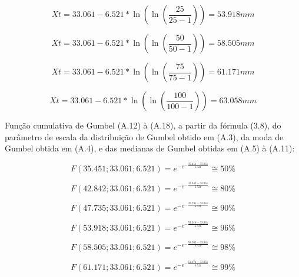 \begin{equation}
Xt = 33.061 - 6.521 * \ln{\left(\ln{\left(\frac{25}{25 - 1}\right)}\right)} = 53.918 mm
\end{equation}

\begin{equation}
Xt = 33.061 - 6.521 * \ln{\left(\ln{\left(\frac{50}{50 - 1}\right)}\right)} = 58.505 mm
\end{equation}

\begin{equation}
Xt = 33.061 - 6.521 * \ln{\left(\ln{\left(\frac{75}{75 - 1}\right)}\right)} = 61.171 mm
\end{equation}

\begin{equation}
Xt = 33.061 - 6.521 * \ln{\left(\ln{\left(\frac{100}{100 - 1}\right)}\right)} = 63.058 mm
\end{equation}

\newpage

Função cumulativa de Gumbel (A.12) à (A.18), a partir da fórmula (3.8), do parâmetro de escala da distribuição de Gumbel obtido em (A.3), da moda de Gumbel obtida em (A.4), e das medianas de Gumbel obtidas em (A.5) à (A.11):\bigskip

\begin{equation}
F(35.451; 33.061; 6.521) = e^{- e^{- \frac{35.451 - 33.061}{6.521}}} \cong 50\% 
\end{equation}

\begin{equation}
F(42.842; 33.061; 6.521) = e^{- e^{- \frac{42.842 - 33.061}{6.521}}} \cong 80\% 
\end{equation}

\begin{equation}
F(47.735; 33.061; 6.521) = e^{- e^{- \frac{47.735 - 33.061}{6.521}}} \cong 90\% 
\end{equation}

\begin{equation}
F(53.918; 33.061; 6.521) = e^{- e^{- \frac{53.918 - 33.061}{6.521}}} \cong 96\% 
\end{equation}

\begin{equation}
F(58.505; 33.061; 6.521) = e^{- e^{- \frac{58.505 - 33.061}{6.521}}} \cong 98\% 
\end{equation}

\begin{equation}
F(61.171; 33.061; 6.521) = e^{- e^{- \frac{61.171 - 33.061}{6.521}}} \cong 99\% 
\end{equation}

